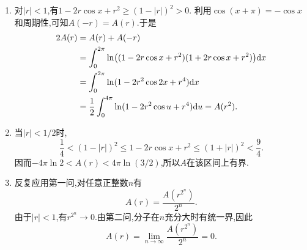 \documentclass{ctexart}
\begin{document}
\begin{solution}
\begin{enumerate}[label=\textbf{(\arabic*)},leftmargin=*]
        \item 对$|r|<1$,有$1-2r\cos x+r^2\geqslant(1-|r|)^2>0$.
            利用$\cos(x+\pi)=-\cos x$和周期性,可知$A(-r)=A(r)$.于是
            \[\begin{aligned}
                2A(r)&=A(r)+A(-r)\\
                &=\int_0^{2\pi}\ln\bigl((1-2r\cos x+r^2)(1+2r\cos x+r^2)\bigr)\mathrm{d} x\\
                &=\int_0^{2\pi}\ln(1-2r^2\cos2x+r^4)\mathrm{d} x\\
                &=\dfrac12\int_0^{4\pi}\ln(1-2r^2\cos u+r^4)\mathrm{d} u=A(r^2).
            \end{aligned}\]
        \item 当$|r|<1/2$时,
            \[\dfrac14<(1-|r|)^2\leqslant1-2r\cos x+r^2\leqslant(1+|r|)^2<\dfrac94.\]
            因而$-4\pi\ln2<A(r)<4\pi\ln(3/2)$,所以$A$在该区间上有界.
        \item 反复应用第一问,对任意正整数$n$有
            \[A(r)=\dfrac{A(r^{2^n})}{2^n}.\]
            由于$|r|<1$,有$r^{2^n}\to0$.由第二问,分子在$n$充分大时有统一界,因此
            \[A(r)=\lim_{n\to\infty}\dfrac{A(r^{2^n})}{2^n}=0.\]
    \end{enumerate}
\end{solution}
\end{document}
